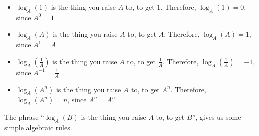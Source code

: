 \documentclass{ximera}
\begin{document}
\begin{conclusion}

\begin{itemize}
\item $\log_A(1)$ is the thing you raise $A$ to, to get $1$. Therefore, $\log_A(1) = 0$, since $A^0 = 1$
\item $\log_A(A)$ is the thing you raise $A$ to, to get $A$. Therefore, $\log_A(A) = 1$, since $A^1 = A$
\item $\log_A(\tfrac{1}{A})$ is the thing you raise $A$ to, to get $\tfrac{1}{A}$. Therefore, $\log_A(\tfrac{1}{A}) = -1$, since $A^{-1} = \tfrac{1}{A}$
\item $\log_A(A^n)$ is the thing you raise $A$ to, to get $A^n$. Therefore, $\log_A(A^n) = n$, since $A^n = A^n$
\end{itemize}

\end{conclusion}


The phrase ``$\log_A(B)$ is the thing you raise $A$ to, to get $B$'', gives us some simple algebraic rules.
\end{document}
